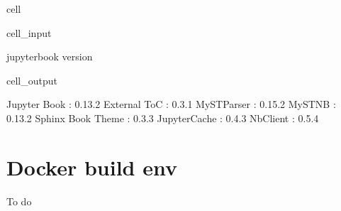 \documentclass[letterpaper,table,10pt,english]{jupyterBook}
\begin{document}
\begin{sphinxuseclass}{cell}\begin{sphinxVerbatimInput}

\begin{sphinxuseclass}{cell_input}
\begin{sphinxVerbatim}[commandchars=\\\{\}]
jupyter\PYGZhy{}book \PYGZhy{}\PYGZhy{}version
\end{sphinxVerbatim}

\end{sphinxuseclass}\end{sphinxVerbatimInput}
\begin{sphinxVerbatimOutput}

\begin{sphinxuseclass}{cell_output}
\begin{sphinxVerbatim}[commandchars=\\\{\}]
Jupyter Book      : 0.13.2
External ToC      : 0.3.1
MyST\PYGZhy{}Parser       : 0.15.2
MyST\PYGZhy{}NB           : 0.13.2
Sphinx Book Theme : 0.3.3
Jupyter\PYGZhy{}Cache     : 0.4.3
NbClient          : 0.5.4
\end{sphinxVerbatim}

\end{sphinxuseclass}\end{sphinxVerbatimOutput}

\end{sphinxuseclass}

\section{Docker build env}
\label{\detokenize{tests/build_versions_checks:docker-build-env}}
\sphinxAtStartPar
To do
\end{document}
